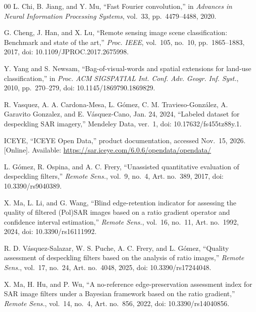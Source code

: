 \documentclass[journal]{IEEEtran}
\begin{document}
\begin{thebibliography}{00}
L. Chi, B. Jiang, and Y. Mu, ``Fast Fourier convolution,'' in \emph{Advances in Neural Information Processing Systems}, vol.~33, pp.~4479--4488, 2020.

G. Cheng, J. Han, and X. Lu, ``Remote sensing image scene classification: Benchmark and state of the art,'' \emph{Proc. IEEE}, vol.~105, no.~10, pp.~1865--1883, 2017, doi: 10.1109/JPROC.2017.2675998.

Y. Yang and S. Newsam, ``Bag-of-visual-words and spatial extensions for land-use classification,'' in \emph{Proc. ACM SIGSPATIAL Int. Conf. Adv. Geogr. Inf. Syst.}, 2010, pp.~270--279, doi: 10.1145/1869790.1869829.

R. Vasquez, A. A. Cardona-Mesa, L. G\'omez, C. M. Travieso-Gonz\'alez, A. Garavito Gonzalez, and E. V\'asquez-Cano, Jan. 24, 2024, ``Labeled dataset for despeckling SAR imagery,'' Mendeley Data, ver.~1, doi: 10.17632/fs455tz88y.1.

ICEYE, ``ICEYE Open Data,'' product documentation, accessed Nov.~15, 2026. [Online]. Available: \url{https://sar.iceye.com/6.0.6/opendata/opendata/}

L. G\'omez, R. Ospina, and A. C. Frery, ``Unassisted quantitative evaluation of despeckling filters,'' \emph{Remote Sens.}, vol.~9, no.~4, Art. no.~389, 2017, doi: 10.3390/rs9040389.

X. Ma, L. Li, and G. Wang, ``Blind edge-retention indicator for assessing the quality of filtered (Pol)SAR images based on a ratio gradient operator and confidence interval estimation,'' \emph{Remote Sens.}, vol.~16, no.~11, Art. no.~1992, 2024, doi: 10.3390/rs16111992.

R. D. V\'asquez-Salazar, W. S. Puche, A. C. Frery, and L. G\'omez, ``Quality assessment of despeckling filters based on the analysis of ratio images,'' \emph{Remote Sens.}, vol.~17, no.~24, Art. no.~4048, 2025, doi: 10.3390/rs17244048.

X. Ma, H. Hu, and P. Wu, ``A no-reference edge-preservation assessment index for SAR image filters under a Bayesian framework based on the ratio gradient,'' \emph{Remote Sens.}, vol.~14, no.~4, Art. no.~856, 2022, doi: 10.3390/rs14040856.

\end{thebibliography}
\end{document}
